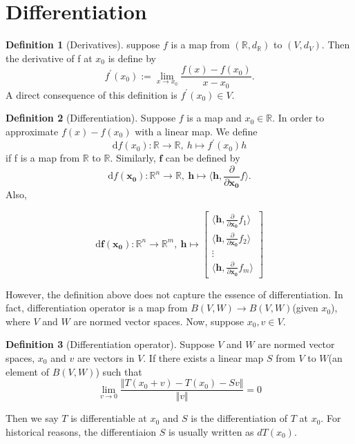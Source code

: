 \documentclass[12pt]{book}
\theoremstyle{definition}
\newtheorem{definition}{Definition}[chapter]
\newcommand{\inner}[2]{{\langle #1,#2\rangle}}
\newcommand{\R}{\mathbb{R}}
\newcommand{\f}{\mathbf{f}}
\newcommand{\drm}{\mathrm{d}}
\newcommand{\pd}[1]{\frac{\partial}{\partial #1}}
\begin{document}
\section{Differentiation}
\begin{definition}[Derivatives]
suppose $f$ is a map from $(\mathbb{R},d_\mathbb{R})$ to $(V,d_V)$. Then the derivative of f at $x_0$ is define by 
$$
f^{\prime}(x_0):=\lim_{x \to x_0} \frac{f(x)-f(x_0)}{x-x_0}.
$$
A direct consequence of this definition is $f^{\prime}(x_0) \in V$.
\end{definition}

\begin{definition}[Differentiation]
Suppose $f$ is a map and $x_0 \in \mathbb{R}$. In order to approximate $f(x)-f(x_0)$ with a linear map. We define
$$
\drm f(x_0): \mathbb{R} \to \mathbb{R}, \ h \mapsto f^{\prime}(x_0)h
$$
if f is a map from $\mathbb R$ to $\mathbb R$. Similarly, $\f$ can be defined by
$$
\drm f(\mathbf{x_0}): \R^n \to \R, \ \mathbf h \mapsto \inner{\mathbf h}{\pd{\mathbf{x_0}}f}.
$$
Also,

$$
\drm \f(\mathbf{x_0}): \R^n \to \R^m, \ \mathbf h \mapsto \begin{bmatrix}
	\inner{\mathbf h}{\pd{\mathbf{x_0}}f_1} \\
	\inner{\mathbf h}{\pd{\mathbf{x_0}}f_2} \\
	\vdots \\
	\inner{\mathbf h}{\pd{\mathbf{x_0}}f_m}
\end{bmatrix}
$$
	
\end{definition}
However, the definition above does not capture the essence of differentiation. In fact, differentiation operator is a map from $B(V,W) \to B(V,W)$(given $x_0$), where $V$ and $W$ are normed vector spaces. Now, suppose $x_0, v \in V$.

\begin{definition}[Differentiation operator]
Suppose $V$ and $W$ are normed vector spaces, $x_0$ and $v$ are vectors in $V$. If there exists a linear map $S$ from $V$ to $W$(an element of $B(V,W)$) such that
$$
\lim_{v \to 0} \frac{\Vert T(x_0+v)-T(x_0)- Sv\Vert}{\Vert v\Vert}=0
$$
\end{definition} 
Then we say $T$ is differentiable at $x_0$ and $S$ is the differentiation of $T$ at $x_0$. For historical reasons, the differentiaion $S$ is usually written as $dT(x_0)$. \par
\end{document}
